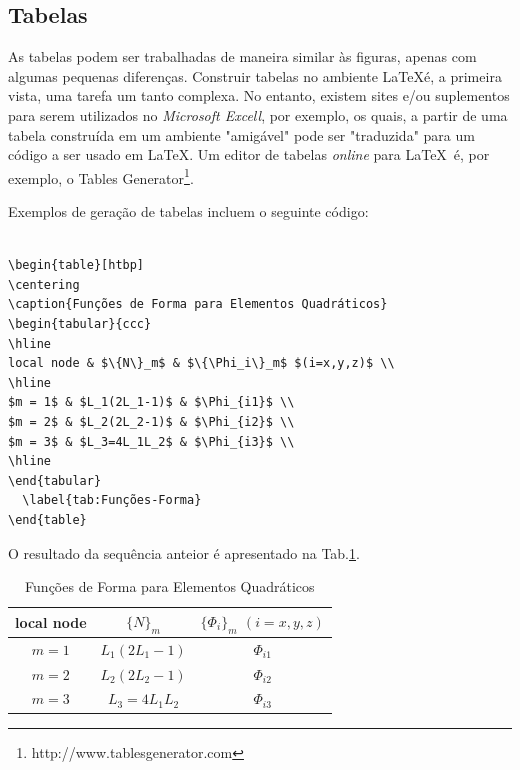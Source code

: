 \documentclass[12pt,A4,A4pt]{article}
\begin{document}
{\subsection{Tabelas}

As tabelas podem ser trabalhadas de maneira similar às figuras, apenas com algumas pequenas diferenças. Construir tabelas no ambiente \LaTeX é, a primeira vista, uma tarefa um tanto complexa. No entanto, existem sites e/ou suplementos para serem utilizados no \textit{Microsoft Excell}, por exemplo, os quais, a partir de uma tabela construída em um ambiente "amigável" pode ser "traduzida" para um código a ser usado em \LaTeX. Um editor de tabelas \emph{online} para \LaTeX\ é, por exemplo, o Tables Generator\footnote{http://www.tablesgenerator.com}.

Exemplos de geração de tabelas incluem o seguinte código:

\begin{verbatim}

\begin{table}[htbp]
\centering
\caption{Funções de Forma para Elementos Quadráticos}
\begin{tabular}{ccc}
\hline
local node & $\{N\}_m$ & $\{\Phi_i\}_m$ $(i=x,y,z)$ \\
\hline
$m = 1$ & $L_1(2L_1-1)$ & $\Phi_{i1}$ \\
$m = 2$ & $L_2(2L_2-1)$ & $\Phi_{i2}$ \\
$m = 3$ & $L_3=4L_1L_2$ & $\Phi_{i3}$ \\
\hline
\end{tabular}
  \label{tab:Funções-Forma}
\end{table}

\end{verbatim}

O resultado da sequência anteior é apresentado na Tab.\ref{tab:Funções-Forma}.

\begin{table}[htbp]
\small
\centering
\caption{\small Funções de Forma para Elementos Quadráticos}
\begin{tabular}{ccc}
\hline
local node & $\{N\}_m$ & $\{\Phi_i\}_m$ $(i=x,y,z)$ \\
\hline
$m = 1$ & $L_1(2L_1-1)$ & $\Phi_{i1}$ \\
$m = 2$ & $L_2(2L_2-1)$ & $\Phi_{i2}$ \\
$m = 3$ & $L_3=4L_1L_2$ & $\Phi_{i3}$ \\
\hline
\end{tabular}
  \label{tab:Funções-Forma}
\end{table}

}
\end{document}
